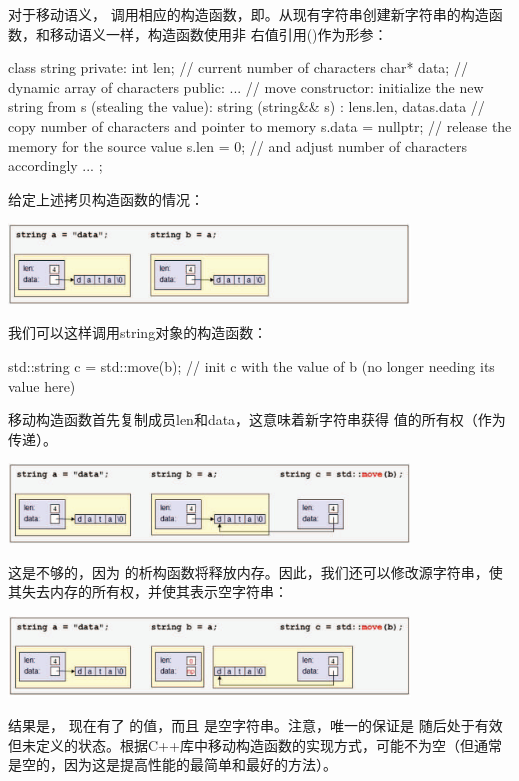 对于移动语义， 调用相应的构造函数，即。从现有字符串创建新字符串的构造函数，和移动语义一样，构造函数使用非  右值引用(\cppinline{&&})作为形参：

\begin{cppcode}
class string {
	private:
	int len; // current number of characters
	char* data; // dynamic array of characters
	public:
	...
	// move constructor: initialize the new string from s (stealing the value):
	string (string&& s)
	: len{s.len}, data{s.data} { // copy number of characters and pointer to memory
		s.data = nullptr; // release the memory for the source value
		s.len = 0; // and adjust number of characters accordingly
	}
	...
};
\end{cppcode}

给定上述拷贝构造函数的情况：

\begin{center}
	\includegraphics[width=0.8\textwidth]{part1/ch1/images/20}
\end{center}

我们可以这样调用string对象的构造函数：

\begin{cppcode}
std::string c = std::move(b); // init c with the value of b (no longer needing its value here)
\end{cppcode}

移动构造函数首先复制成员len和data，这意味着新字符串获得  值的所有权（作为  传递）。

\begin{center}
	\includegraphics[width=0.8\textwidth]{part1/ch1/images/21}
\end{center}

这是不够的，因为  的析构函数将释放内存。因此，我们还可以修改源字符串，使其失去内存的所有权，并使其表示空字符串：

\begin{center}
	\includegraphics[width=0.8\textwidth]{part1/ch1/images/22}
\end{center}

结果是， 现在有了  的值，而且  是空字符串。注意，唯一的保证是  随后处于有效但未定义的状态。根据C++库中移动构造函数的实现方式，可能不为空（但通常是空的，因为这是提高性能的最简单和最好的方法）。


















